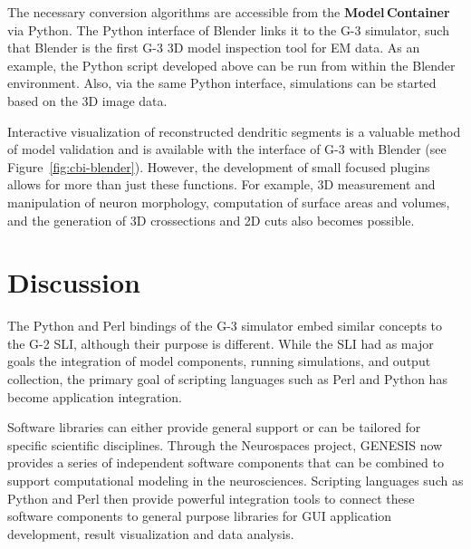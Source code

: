 \documentclass[12pt]{article}
\begin{document}
The necessary conversion algorithms are accessible from the
{\bf Model\,Container} via Python.  The Python interface of Blender links it to the G-3
simulator, such that Blender is the first G-3 3D model inspection
tool for EM data.  As an example, the Python script developed above
can be run from within the Blender environment.  Also, via the same
Python interface, simulations can be started based on the 3D image
data.

Interactive visualization of reconstructed dendritic segments is a
valuable method of model validation and is available with the
interface of G-3 with Blender (see Figure~\ref{fig:cbi-blender}).
However, the development of small focused plugins allows for more than
just these functions. For example, 3D measurement and manipulation of
neuron morphology, computation of surface areas and volumes, and the
generation of 3D crossections and 2D cuts also becomes possible.

\section{Discussion}

The Python and Perl bindings of the G-3 simulator embed similar
concepts to the G-2 SLI, although their purpose is different.
While the SLI had as major goals the integration of model components,
running simulations, and output collection, the primary goal of
scripting languages such as Perl and Python has become application
integration.

Software libraries can either provide general support or can be
tailored for specific scientific disciplines.  Through the Neurospaces
project, GENESIS now provides a series of independent software components that can be combined to
support computational modeling in the neurosciences.  Scripting 
languages such as Python and Perl then provide powerful
integration tools to connect these software components to general
purpose libraries for GUI application development, result
visualization and data analysis.
\end{document}
